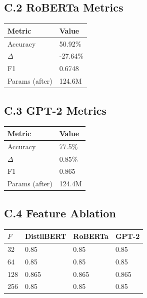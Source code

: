 \subsection{C.2 RoBERTa Metrics}

\begin{table}[H]
\centering
\small
\begin{tabular}{ll}
\toprule
\textbf{Metric} & \textbf{Value} \\
\midrule
Accuracy & 50.92\% \\
$\Delta$ & -27.64\% \\
F1 & 0.6748 \\
Params (after) & 124.6M \\
\bottomrule
\end{tabular}
\end{table}

\subsection{C.3 GPT-2 Metrics}

\begin{table}[H]
\centering
\small
\begin{tabular}{ll}
\toprule
\textbf{Metric} & \textbf{Value} \\
\midrule
Accuracy & 77.5\% \\
$\Delta$ & 0.85\% \\
F1 & 0.865 \\
Params (after) & 124.4M \\
\bottomrule
\end{tabular}
\end{table}

\subsection{C.4 Feature Ablation}

\begin{table}[H]
\centering
\small
\begin{tabular}{llll}
\toprule
\textbf{$F$} & \textbf{DistilBERT} & \textbf{RoBERTa} & \textbf{GPT-2} \\
\midrule
32 & 0.85 & 0.85 & 0.85 \\
64 & 0.85 & 0.85 & 0.85 \\
128 & 0.865 & 0.865 & 0.865 \\
256 & 0.85 & 0.85 & 0.85 \\
\bottomrule
\end{tabular}
\end{table}

